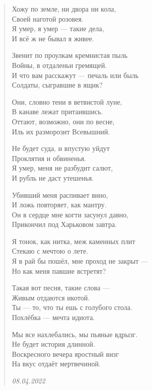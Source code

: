 \documentclass[a4paper,12pt]{article}
\begin{document}
\begin{verse}

Хожу по земле, ни двора ни кола,\\
Своей наготой розовея.\\
Я умер, я умер --- такие дела,\\
И всё ж не бывал я живее.

Звенит по проулкам кремнистая пыль\\
Войны, в отдаленьи гремящей.\\
И что вам расскажут --- печаль или быль\\
Солдаты, сыгравшие в ящик?

Они, словно тени в ветвистой луне,\\
В канаве лежат притаившись.\\
Оттают, возможно, они по весне,\\
Иль их разморозит Всевышний.

Не будет суда, и впустую уйдут\\
Проклятия и обвиненья.\\
Я умер, меня не разбудит салют,\\
И рубль не даст утешенья.

Убивший меня распивает вино,\\
И ложь повторяет, как мантру.\\
Он в сердце мне когти засунул давно,\\
Прикончил под Харьковом завтра.

Я тонок, как нитка, меж каменных плит\\
Стекаю с мечтою о лете.\\
Я в рай бы пошёл, мне проход не закрыт ---\\
Но как меня павшие встретят?

Такая вот песня, такие слова ---\\
Живым отдаются икотой.\\
Ты --- то, что ты ешь с голубого стола.\\
Похлёбка --- мечта идиота.

Мы все нахлебались, мы пьяные вдрызг.\\
Не будет история длинной.\\
Воскресного вечера яростный визг\\
На вкус отдаёт мертвечиной.

\emph{08.04.2022}
\end{verse}
\end{document}
